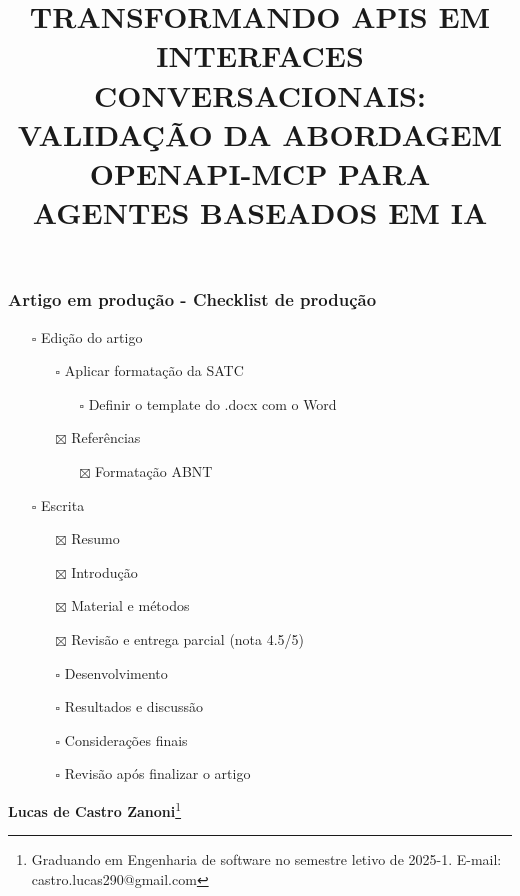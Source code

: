 \documentclass[
]{article}
\title{\textbf{TRANSFORMANDO APIS EM INTERFACES CONVERSACIONAIS:
VALIDAÇÃO DA ABORDAGEM OPENAPI-MCP PARA AGENTES BASEADOS EM IA}}
\author{}
\date{}
\providecommand{\tightlist}{%
  \setlength{\itemsep}{0pt}\setlength{\parskip}{0pt}}
\begin{document}
\maketitle

\subsubsection{Artigo em produção - Checklist de
produção}\label{artigo-em-produuxe7uxe3o---checklist-de-produuxe7uxe3o}

\begin{itemize}
\tightlist
\item[$\square$]
  Edição do artigo

  \begin{itemize}
  \tightlist
  \item[$\square$]
    Aplicar formatação da SATC

    \begin{itemize}
    \tightlist
    \item[$\square$]
      Definir o template do .docx com o Word
    \end{itemize}
  \item[$\boxtimes$]
    Referências

    \begin{itemize}
    \tightlist
    \item[$\boxtimes$]
      Formatação ABNT
    \end{itemize}
  \end{itemize}
\item[$\square$]
  Escrita

  \begin{itemize}
  \tightlist
  \item[$\boxtimes$]
    Resumo
  \item[$\boxtimes$]
    Introdução
  \item[$\boxtimes$]
    Material e métodos
  \item[$\boxtimes$]
    Revisão e entrega parcial (nota 4.5/5)
  \item[$\square$]
    Desenvolvimento
  \item[$\square$]
    Resultados e discussão
  \item[$\square$]
    Considerações finais
  \item[$\square$]
    Revisão após finalizar o artigo
  \end{itemize}
\end{itemize}

\textbf{Lucas de Castro Zanoni}\footnote{Graduando em Engenharia de
  software no semestre letivo de 2025-1. E-mail:
  castro.lucas290@gmail.com}
\end{document}
